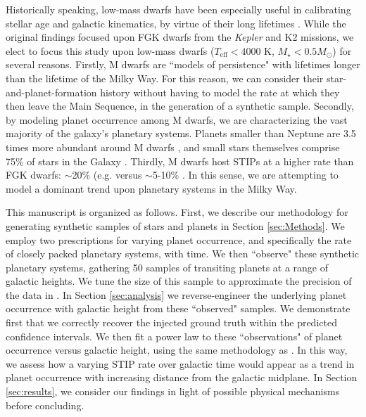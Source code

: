 \documentclass[twocolumn]{aastex631}
\begin{document}
 Historically speaking, low-mass dwarfs have been especially useful in calibrating stellar age and galactic kinematics, by virtue of their long lifetimes \citep{reid_palomarmsu_1995, faherty_brown_2009, kiman_exploring_2019, angus_exploring_2020, popinchalk_evaluating_2021}. While the original \cite{zink_scaling_2023} findings focused upon FGK dwarfs from the \textit{Kepler} and K2 missions, we elect to focus this study upon low-mass dwarfs ($T_{\textrm{eff}}<4000$ K, $M_{\star}<0.5M_{\odot}$) for several reasons. Firstly, M dwarfs are ``models of persistence" \citep{Shields16} with lifetimes longer than the lifetime of the Milky Way. For this reason, we can consider their star-and-planet-formation history without having to model the rate at which they then leave the Main Sequence, in the generation of a synthetic sample. Secondly, by modeling planet occurrence among M dwarfs, we are characterizing the vast majority of the galaxy's planetary systems. Planets smaller than Neptune are 3.5 times more abundant around M dwarfs \citep{Mulders15}, and small stars themselves comprise 75\% of stars in the Galaxy \citep{Henry04}. Thirdly, M dwarfs host STIPs at a higher rate than FGK dwarfs: $\sim$20\% (e.g. \citealt{Ballard16, Muirhead15} versus $\sim$5-10\% \citep{lissauer_closely_2011, volk_consolidating_2015, lam_ages_2024}. In this sense, we are attempting to model a dominant trend upon planetary systems in the Milky Way. 

 This manuscript is organized as follows. First, we describe our methodology for generating synthetic samples of stars and planets in Section \ref{sec:Methods}. We employ two prescriptions for varying planet occurrence, and specifically the rate of closely packed planetary systems, with time. We then ``observe" these synthetic planetary systems, gathering 50 samples of transiting planets at a range of galactic heights. We tune the size of this sample to approximate the precision of the data in \cite{zink_scaling_2023}. In Section \ref{sec:analysis} we reverse-engineer the underlying planet occurrence with galactic height from these ``observed" samples. We demonstrate first that we correctly recover the injected ground truth within the predicted confidence intervals. We then fit a power law to these ``observations" of planet occurrence versus galactic height, using the same methodology as \cite{zink_scaling_2023}. In this way, we assess how a varying STIP rate over galactic time would appear as a trend in planet occurrence with increasing distance from the galactic midplane. In Section \ref{sec:results}, we consider our findings in light of possible physical mechanisms before concluding.    
\end{document}

